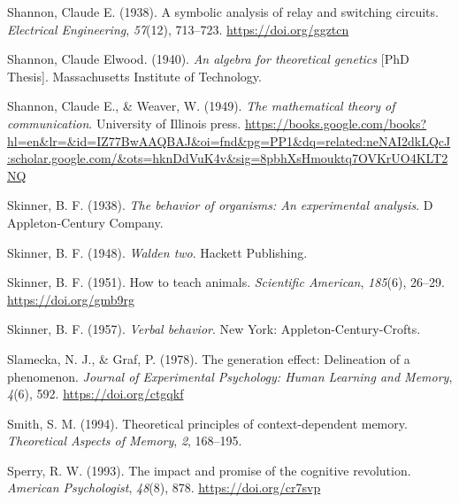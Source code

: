 \documentclass[
  oneside,
  12pt]{crumpbook}
\newlength{\cslhangindent}
\newlength{\cslentryspacingunit} %
\newenvironment{CSLReferences}[2] %
 {%
  \setlength{\parindent}{0pt}
  \ifodd #1
  \let\oldpar\par
  \def\par{\hangindent=\cslhangindent\oldpar}
  \fi
  \setlength{\parskip}{#2\cslentryspacingunit}
 }%
 {}
\begin{document}
\begin{CSLReferences}{1}{0}
\leavevmode{}%
Shannon, Claude E. (1938). A symbolic analysis of relay and switching circuits. \emph{Electrical Engineering}, \emph{57}(12), 713--723. \url{https://doi.org/ggztcn}

\leavevmode{}%
Shannon, Claude Elwood. (1940). \emph{An algebra for theoretical genetics} {[}PhD Thesis{]}. {Massachusetts Institute of Technology}.

\leavevmode{}%
Shannon, Claude E., \& Weaver, W. (1949). \emph{The mathematical theory of communication}. {University of Illinois press}. \url{https://books.google.com/books?hl=en\&lr=\&id=IZ77BwAAQBAJ\&oi=fnd\&pg=PP1\&dq=related:neNAI2dkLQcJ:scholar.google.com/\&ots=hknDdVuK4v\&sig=8pbhXsHmouktq7OVKrUO4KLT2NQ}

\leavevmode{}%
Skinner, B. F. (1938). \emph{The behavior of organisms: {An} experimental analysis}. {D Appleton-Century Company}.

\leavevmode{}%
Skinner, B. F. (1948). \emph{Walden two}. {Hackett Publishing}.

\leavevmode{}%
Skinner, B. F. (1951). How to teach animals. \emph{Scientific American}, \emph{185}(6), 26--29. \url{https://doi.org/gmb9rg}

\leavevmode{}%
Skinner, B. F. (1957). \emph{Verbal behavior}. {New York: Appleton-Century-Crofts}.

\leavevmode{}%
Slamecka, N. J., \& Graf, P. (1978). The generation effect: {Delineation} of a phenomenon. \emph{Journal of Experimental Psychology: Human Learning and Memory}, \emph{4}(6), 592. \url{https://doi.org/ctgqkf}

\leavevmode{}%
Smith, S. M. (1994). Theoretical principles of context-dependent memory. \emph{Theoretical Aspects of Memory}, \emph{2}, 168--195.

\leavevmode{}%
Sperry, R. W. (1993). The impact and promise of the cognitive revolution. \emph{American Psychologist}, \emph{48}(8), 878. \url{https://doi.org/cr7svp}


\end{CSLReferences}
\end{document}
